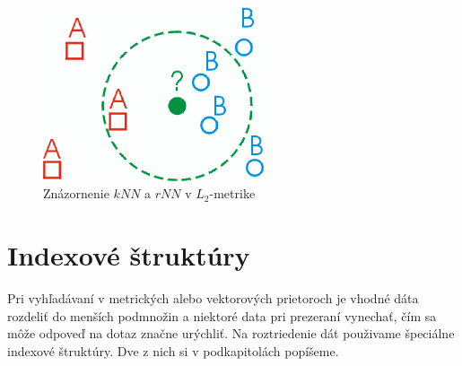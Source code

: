\documentclass[12pt,oneside]{fithesis2}
\begin{document}
	\begin{figure}
  		\centering
  		\includegraphics[width=6.5cm]{obr/Image25.eps}
  		\caption{Znázornenie $kNN$ a $rNN$ v $L_2$-metrike}
	\end{figure}  

\section{Indexové štruktúry}

Pri vyhľadávaní v metrických alebo vektorových prietoroch je vhodné dáta rozdeliť do menších podmnožin a niektoré data pri prezeraní vynechať, čím sa môže odpoveď na dotaz značne urýchliť. Na roztriedenie dát použivame špeciálne indexové štruktúry. Dve z nich si v podkapitolách popíšeme.
\end{document}
